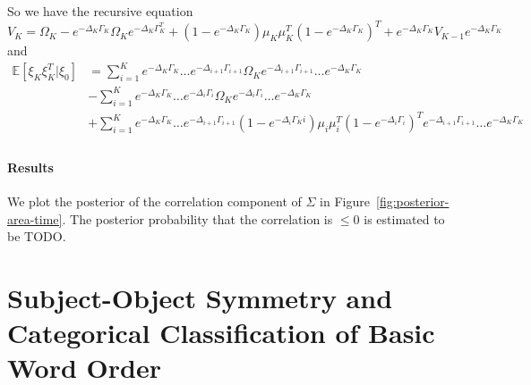 \documentclass[11pt,a4paper]{article}
\begin{document}
So we have the recursive equation
\begin{equation}
V_K = \Omega_K - e^{-\Delta_K \Gamma_K} \Omega_K e^{-\Delta_K \Gamma_K^T}  + (1-e^{-\Delta_K \Gamma_K})\mu_K \mu_K^T (1-e^{-\Delta_K \Gamma_K})^T + e^{-\Delta_K\Gamma_K} V_{K-1} e^{-\Delta_K\Gamma_K}
\end{equation}
and 
\begin{align*}
\mathbb{E}[\xi_K \xi_K^T | \xi_0] & =  \sum_{i=1}^K e^{-\Delta_K\Gamma_K}\dots e^{-\Delta_{i+1}\Gamma_{i+1}} \Omega_K e^{-\Delta_{i+1}\Gamma_{i+1}}\dots e^{-\Delta_K\Gamma_K} \\
& - \sum_{i=1}^K e^{-\Delta_K\Gamma_K}\dots e^{-\Delta_{i}\Gamma_{i}} \Omega_K e^{-\Delta_{i}\Gamma_{i}}\dots e^{-\Delta_K\Gamma_K} \\
&+ \sum_{i=1}^K e^{-\Delta_K\Gamma_K}\dots e^{-\Delta_{i+1}\Gamma_{i+1}} (1-e^{-\Delta_i \Gamma_Ki})\mu_i \mu_i^T (1-e^{-\Delta_i \Gamma_i})^T e^{-\Delta_{i+1}\Gamma_{i+1}}\dots e^{-\Delta_K\Gamma_K} \\
\end{align*}



\paragraph{Results}
We plot the posterior of the correlation component of $\Sigma$ in Figure~\ref{fig:posterior-area-time}.
The posterior probability that the correlation is $\leq 0$ is estimated to be TODO.







\section{Subject-Object Symmetry and Categorical Classification of Basic Word Order}
\end{document}
